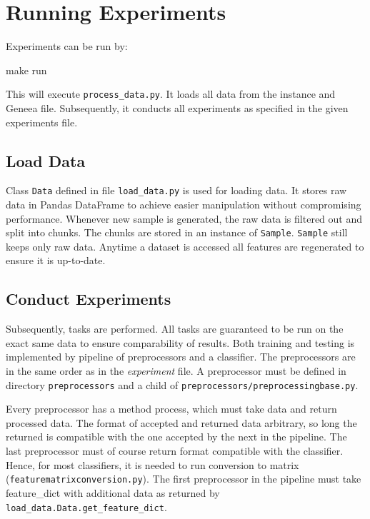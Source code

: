 \section{Running Experiments}

Experiments can be run by:

\begin{code}
make run
\end{code}

This will execute \texttt{process\_data.py}.
It loads all data from the instance and Geneea file.
Subsequently, it conducts all experiments as specified in the given experiments file.

\subsection{Load Data}

Class \texttt{Data} defined in file \texttt{load\_data.py} is used for loading data.
It stores raw data in Pandas DataFrame to achieve easier manipulation without compromising performance.
Whenever new sample is generated, the raw data is filtered out and split
into chunks.
The chunks are stored in an instance of \texttt{Sample}.
\texttt{Sample} still keeps only raw data.
Anytime a dataset is accessed all features are regenerated to ensure it is up-to-date.


\subsection{Conduct Experiments}

Subsequently, tasks are performed.
All tasks are guaranteed to be run on the exact same data to ensure comparability of results.
Both training and testing is implemented by pipeline of preprocessors and a classifier.
The preprocessors are in the same order as in the \textit{experiment} file.
A preprocessor must be defined in directory \texttt{preprocessors} and a child of \texttt{preprocessors/preprocessingbase.py}.

Every preprocessor has a method process, which must take data and return processed data.
The format of accepted and returned data arbitrary, so long the returned is compatible
with the one accepted by the next in the pipeline.
The last preprocessor must of course return format compatible with the classifier.
Hence, for most classifiers, it is needed to run conversion to matrix (\texttt{featurematrixconversion.py}).
The first preprocessor in the pipeline must take feature\_dict with additional data as returned by \texttt{load\_data.Data.get\_feature\_dict}.

